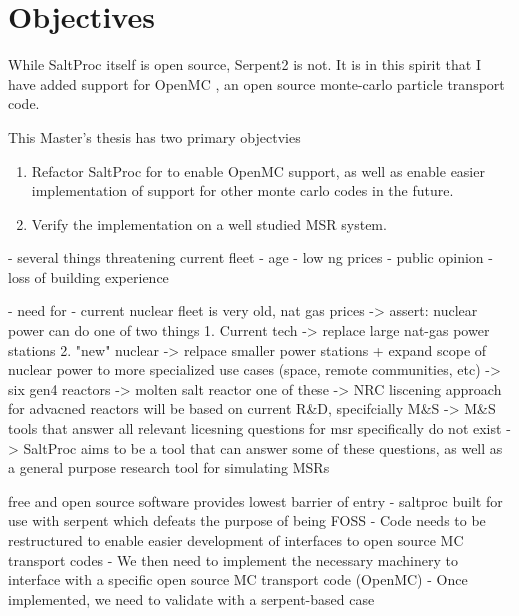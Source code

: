 \section{Objectives}%
\label{sec:objectives}

While SaltProc itself is open source, Serpent2 is not. It is in this spirit that I have added support for OpenMC \cite{romano_openmc_2015}, an open source monte-carlo particle transport code.

This Master's thesis has two primary objectvies
\begin{enumerate}
    \item Refactor SaltProc for to enable OpenMC support, as well as enable easier implementation of support for other monte carlo codes in the future. 
    \item Verify the implementation on a well studied MSR system.
\end{enumerate}


- several things threatening current fleet
  - age
  - low ng prices
  - public opinion
  - loss of building experience

- need for 
- current nuclear fleet is very old, nat gas prices
 -> assert: nuclear power can do one of two things
    1. Current tech -> replace large nat-gas power stations 
    2. "new" nuclear -> relpace smaller power stations + expand scope
        of nuclear power to more specialized use cases (space, remote communities, etc)
-> six gen4 reactors -> molten salt reactor one of these
-> NRC liscening approach for advacned reactors will be based on current R\&D, specifcially M\&S
-> M\&S tools that answer all relevant licesning questions for msr specifically do not exist
-> SaltProc aims to be a tool that can answer some of these questions, as well as a general purpose
    research tool for simulating MSRs


 free and open source software provides lowest barrier of entry
 - saltproc built for use with serpent which defeats the purpose of being
    FOSS
 - Code needs to be restructured to enable easier development of interfaces to 
 open source MC transport codes
 - We then need to implement the necessary machinery to interface with a specific
    open source MC transport code (OpenMC)
 - Once implemented, we need to validate with a serpent-based case

